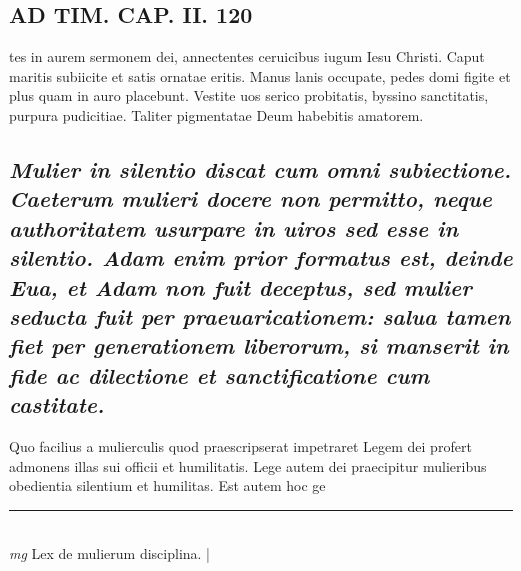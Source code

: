 \documentclass{article}
\begin{document}
\begin{pages}
\section*{AD TIM. CAP. II. 120 }\pstart tes in aurem sermonem dei, annectentes ceruicibus iugum Iesu Christi. Caput maritis subiicite et satis ornatae eritis. Manus lanis occupate, pedes domi figite et plus quam in auro placebunt. Vestite uos serico probitatis, byssino sanctitatis, purpura pudicitiae. Taliter pigmentatae Deum habebitis amatorem.  \pend
{}
{}
\subsection*{\textit{Mulier in silentio discat cum omni subiectione. Caeterum mulieri docere non permitto, neque authoritatem usurpare in uiros sed esse in silentio. Adam enim prior formatus est, deinde Eua, et Adam non fuit deceptus, sed mulier seducta fuit per praeuaricationem: salua tamen fiet per generationem liberorum, si manserit in fide ac dilectione et sanctificatione cum castitate. }}\pstart Quo facilius a mulierculis quod praescripserat impetraret Legem dei profert admonens illas sui officii et humilitatis. Lege autem dei praecipitur mulieribus obedientia silentium et humilitas. Est autem hoc ge\pend
\vspace{0.5cm}\noindent
\vspace{0.2cm}\rule{1cm}{0.2pt}\\ 
\hspace{0.2cm}\textit{mg}
\footnotesize Lex de mulierum disciplina. 
\normalsize| 

\end{pages}
\end{document}
